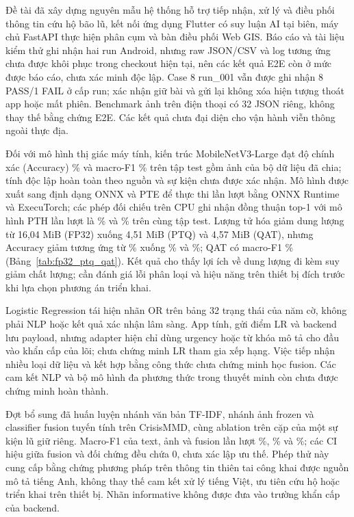 \label{chap:conclusion}
Đề tài đã xây dựng nguyên mẫu hệ thống hỗ trợ tiếp nhận, xử lý và điều phối thông tin cứu hộ bão lũ, kết nối ứng dụng Flutter có suy luận AI tại biên, máy chủ FastAPI thực hiện phân cụm và bàn điều phối Web GIS. Báo cáo và tài liệu kiểm thử ghi nhận hai run Android, nhưng raw JSON/CSV và log tương ứng chưa được khôi phục trong checkout hiện tại, nên các kết quả E2E còn ở mức được báo cáo, chưa xác minh độc lập. Case 8 run\_001 vẫn được ghi nhận 8 PASS/1 FAIL ở cấp run; xác nhận giữ bài và gửi lại không xóa hiện tượng thoát app hoặc mất phiên. Benchmark ảnh trên điện thoại có 32 JSON riêng, không thay thế bằng chứng E2E. Các kết quả chưa đại diện cho vận hành viễn thông ngoài thực địa.

Đối với mô hình thị giác máy tính, kiến trúc MobileNetV3-Large đạt độ chính xác (Accuracy) \NewImageAccuracy\% và macro-F1 \NewImageMacroFOne\% trên tập test gồm \ImageTest{} ảnh của bộ dữ liệu đã chia; tính độc lập hoàn toàn theo nguồn và sự kiện chưa được xác nhận. Mô hình được xuất sang định dạng ONNX và PTE để thực thi lần lượt bằng ONNX Runtime và ExecuTorch; các phép đối chiếu trên CPU ghi nhận đồng thuận top-1 với mô hình PTH lần lượt là \CpuOnnxAgreement\% và \CpuPteAgreement\% trên cùng tập test. Lượng tử hóa giảm dung lượng từ 16,04 MiB (FP32) xuống 4,51 MiB (PTQ) và 4,57 MiB (QAT), nhưng Accuracy giảm tương ứng từ \NewImageAccuracy\% xuống \PTQAccuracy\% và \QATAccuracy\%; QAT có macro-F1 \QATMacroFOne\% (Bảng~\ref{tab:fp32_ptq_qat}). Kết quả cho thấy lợi ích về dung lượng đi kèm suy giảm chất lượng; cần đánh giá lỗi phân loại và hiệu năng trên thiết bị đích trước khi lựa chọn phương án triển khai.

Logistic Regression tái hiện nhãn OR trên bảng 32 trạng thái của năm cờ, không phải NLP hoặc kết quả xác nhận lâm sàng. App tính, gửi điểm LR và backend lưu payload, nhưng adapter hiện chỉ dùng urgency hoặc từ khóa mô tả cho đầu vào khẩn cấp của lõi; chưa chứng minh LR tham gia xếp hạng. Việc tiếp nhận nhiều loại dữ liệu và kết hợp bằng công thức chưa chứng minh học fusion. Các cam kết NLP và bộ mô hình đa phương thức trong thuyết minh còn chưa được chứng minh hoàn thành.

Đợt bổ sung đã huấn luyện nhánh văn bản TF-IDF, nhánh ảnh frozen và classifier fusion tuyến tính trên CrisisMMD, cùng ablation trên \MMTestN{} cặp của một sự kiện lũ giữ riêng. Macro-F1 của text, ảnh và fusion lần lượt \MMTextFOne\%, \MMImageFOne\% và \MMFusionFOne\%; các CI hiệu giữa fusion và đối chứng đều chứa 0, chưa xác lập ưu thế. Phép thử này cung cấp bằng chứng phương pháp trên thông tin thiên tai công khai được nguồn mô tả tiếng Anh, không thay thế cam kết xử lý tiếng Việt, ưu tiên cứu hộ hoặc triển khai trên thiết bị. Nhãn informative không được đưa vào trường khẩn cấp của backend.

